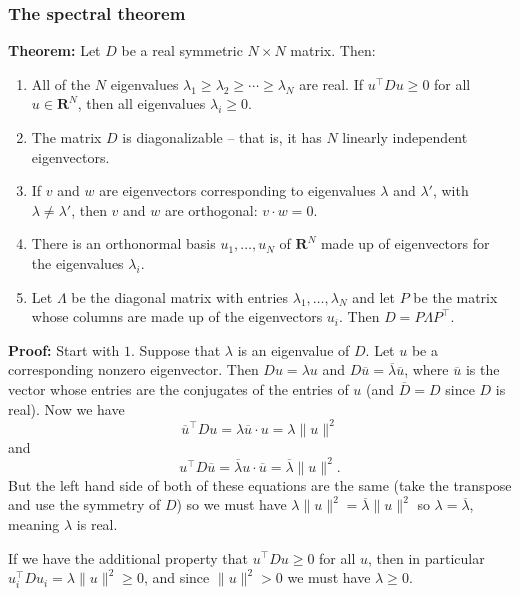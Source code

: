 \documentclass[
]{article}
\providecommand{\tightlist}{%
  \setlength{\itemsep}{0pt}\setlength{\parskip}{0pt}}
\begin{document}
\hypertarget{the-spectral-theorem}{%
\subsubsection{The spectral theorem}\label{the-spectral-theorem}}

\textbf{Theorem:} Let \(D\) be a real symmetric \(N\times N\) matrix.
Then:

\begin{enumerate}
\def\labelenumi{\arabic{enumi}.}
\tightlist
\item
  All of the \(N\) eigenvalues
  \(\lambda_1\ge \lambda_2\ge \cdots \ge \lambda_{N}\) are real. If
  \(u^{\intercal}Du\ge 0\) for all \(u\in\mathbf{R}^{N}\), then all
  eigenvalues \(\lambda_{i}\ge 0\).
\item
  The matrix \(D\) is diagonalizable -- that is, it has \(N\) linearly
  independent eigenvectors.
\item
  If \(v\) and \(w\) are eigenvectors corresponding to eigenvalues
  \(\lambda\) and \(\lambda'\), with \(\lambda\not=\lambda'\), then
  \(v\) and \(w\) are orthogonal: \(v\cdot w=0\).
\item
  There is an orthonormal basis \(u_{1},\ldots, u_{N}\) of
  \(\mathbf{R}^{N}\) made up of eigenvectors for the eigenvalues
  \(\lambda_{i}\).
\item
  Let \(\Lambda\) be the diagonal matrix with entries
  \(\lambda_{1},\ldots, \lambda_{N}\) and let \(P\) be the matrix whose
  columns are made up of the eigenvectors \(u_{i}\). Then
  \(D=P\Lambda P^{\intercal}\).
\end{enumerate}

\textbf{Proof:} Start with \(1\). Suppose that \(\lambda\) is an
eigenvalue of \(D\). Let \(u\) be a corresponding nonzero eigenvector.
Then \(Du=\lambda u\) and
\(D\overline{u}=\overline{\lambda}\overline{u}\), where \(\overline{u}\)
is the vector whose entries are the conjugates of the entries of \(u\)
(and \(\overline{D}=D\) since \(D\) is real). Now we have \[
\overline{u}^{\intercal}Du = \lambda \overline{u}\cdot u = \lambda\|u\|^2
\] and \[
u^{\intercal}D\overline{u} = \overline{\lambda}u\cdot \overline{u} = \overline{\lambda}\|u\|^2.
\] But the left hand side of both of these equations are the same (take
the transpose and use the symmetry of \(D\)) so we must have
\(\lambda\|u\|^2 = \overline{\lambda}\|u\|^2\) so
\(\lambda=\overline{\lambda}\), meaning \(\lambda\) is real.

If we have the additional property that \(u^{\intercal}Du\ge 0\) for all
\(u\), then in particular
\(u_{i}^{\intercal}Du_{i} = \lambda\|u\|^2\ge 0\), and since
\(\|u\|^2> 0\) we must have \(\lambda\ge 0\).
\end{document}
